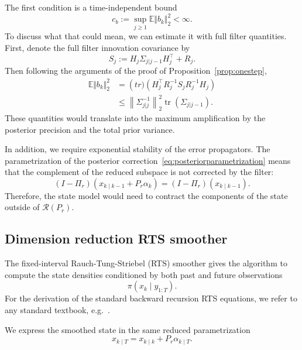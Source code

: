 \documentclass[a4paper,12pt]{article}
\begin{document}
The first condition is a time-independent bound
\begin{equation}
    c_b := \sup_{j \geq  1} \mathbb{E} \Vert b_k \Vert_{2}^{2} < \infty.\label{eq:bbound}
\end{equation}
To discuss what that could mean, we can estimate it with full filter quantities.
First, denote the full filter innovation covariance by
\begin{equation}
    S_j := H_j \Sigma_{j \vert j-1} H_{j}^{\top} + R_j.
\end{equation}
Then following the arguments of the proof of Proposition~\ref{prop:onestep},
\begin{align}
    \mathbb{E} \Vert b_k \Vert_{2}^{2}
    &= \operatorname(tr) \left( H_{j}^{\top} R_{j}^{-1} S_j R_{j}^{-1} H_{j} \right)\\
    &\leq \left\lVert \Sigma_{j \vert j}^{-1} \right\rVert_{2}^{2} \operatorname{tr}\left(\Sigma_{j \vert j-1}\right).
\end{align}
These quantities would translate into the maximum amplification by the posterior precision and the total prior variance.

In addition, we require exponential stability of the error propagators.
The parametrization of the posterior correction~\eqref{eq:posteriorparametrization} means that the complement of the reduced subspace is not corrected by the filter:
\begin{equation}
    (I-\Pi_r)(x_{k \mid k-1} + P_r \alpha_k) = (I-\Pi_r)(x_{k \mid k-1}).
\end{equation}
Therefore, the state model would need to contract the components of the state outside of $\mathcal{R}(P_r)$.

\subsection{Dimension reduction RTS smoother}
The fixed-interval Rauch-Tung-Striebel (RTS) smoother gives the algorithm to compute the state densities conditioned by both past and future observations
\begin{equation}
    \pi(x_{k} \mid y_{1:T}).
\end{equation}
For the derivation of the standard backward recursion RTS equations, we refer to any standard textbook, e.g.~\cite{sarkka}.

We express the smoothed state in the same reduced parametrization
\begin{equation}
    x_{k \mid T} = x_{k \mid k} + P_r \alpha_{k \mid T}.
\end{equation}
\end{document}
